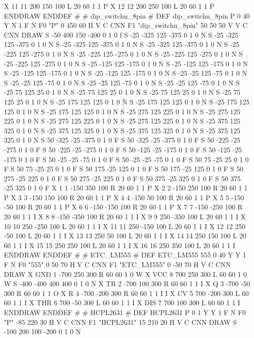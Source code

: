 X 11 11 200 150 100 L 20 60 1 1 P
X 12 12 200 250 100 L 20 60 1 1 P
ENDDRAW
ENDDEF
#
# dip_switchn_8pin
#
DEF dip_switchn_8pin P 0 40 Y N 1 F N
F0 "P" 0 450 60 H V C CNN
F1 "dip_switchn_8pin" 50 50 50 V V C CNN
DRAW
S -50 400 150 -400 0 1 0 f
S -25 -325 125 -375 0 1 0 N
S -25 -325 125 -375 0 1 0 N
S -25 -325 125 -375 0 1 0 N
S -25 -325 125 -375 0 1 0 N
S -25 -225 125 -275 0 1 0 N
S -25 -225 125 -275 0 1 0 N
S -25 -225 125 -275 0 1 0 N
S -25 -225 125 -275 0 1 0 N
S -25 -125 125 -175 0 1 0 N
S -25 -125 125 -175 0 1 0 N
S -25 -125 125 -175 0 1 0 N
S -25 -125 125 -175 0 1 0 N
S -25 -25 125 -75 0 1 0 N
S -25 -25 125 -75 0 1 0 N
S -25 -25 125 -75 0 1 0 N
S -25 -25 125 -75 0 1 0 N
S -25 75 125 25 0 1 0 N
S -25 75 125 25 0 1 0 N
S -25 75 125 25 0 1 0 N
S -25 75 125 25 0 1 0 N
S -25 175 125 125 0 1 0 N
S -25 175 125 125 0 1 0 N
S -25 175 125 125 0 1 0 N
S -25 175 125 125 0 1 0 N
S -25 275 125 225 0 1 0 N
S -25 275 125 225 0 1 0 N
S -25 275 125 225 0 1 0 N
S -25 275 125 225 0 1 0 N
S -25 375 125 325 0 1 0 N
S -25 375 125 325 0 1 0 N
S -25 375 125 325 0 1 0 N
S -25 375 125 325 0 1 0 N
S 50 -325 -25 -375 0 1 0 F
S 50 -325 -25 -375 0 1 0 F
S 50 -225 -25 -275 0 1 0 F
S 50 -225 -25 -275 0 1 0 F
S 50 -125 -25 -175 0 1 0 F
S 50 -125 -25 -175 0 1 0 F
S 50 -25 -25 -75 0 1 0 F
S 50 -25 -25 -75 0 1 0 F
S 50 75 -25 25 0 1 0 F
S 50 75 -25 25 0 1 0 F
S 50 175 -25 125 0 1 0 F
S 50 175 -25 125 0 1 0 F
S 50 275 -25 225 0 1 0 F
S 50 275 -25 225 0 1 0 F
S 50 375 -25 325 0 1 0 F
S 50 375 -25 325 0 1 0 F
X 1 1 -150 350 100 R 20 60 1 1 P
X 2 2 -150 250 100 R 20 60 1 1 P
X 3 3 -150 150 100 R 20 60 1 1 P
X 4 4 -150 50 100 R 20 60 1 1 P
X 5 5 -150 -50 100 R 20 60 1 1 P
X 6 6 -150 -150 100 R 20 60 1 1 P
X 7 7 -150 -250 100 R 20 60 1 1 I
X 8 8 -150 -350 100 R 20 60 1 1 I
X 9 9 250 -350 100 L 20 60 1 1 I
X 10 10 250 -250 100 L 20 60 1 1 I
X 11 11 250 -150 100 L 20 60 1 1 I
X 12 12 250 -50 100 L 20 60 1 1 I
X 13 13 250 50 100 L 20 60 1 1 I
X 14 14 250 150 100 L 20 60 1 1 I
X 15 15 250 250 100 L 20 60 1 1 I
X 16 16 250 350 100 L 20 60 1 1 I
ENDDRAW
ENDDEF
#
# ETC_LM555
#
DEF ETC_LM555 555 0 40 Y Y 1 F N
F0 "555" 0 50 70 H V C CNN
F1 "ETC_LM555" 0 -50 70 H V C CNN
DRAW
X GND 1 -700 250 300 R 60 60 1 0 W
X VCC 8 700 250 300 L 60 60 1 0 W
S -400 -400 400 400 0 1 0 N
X TR 2 -700 100 300 R 60 60 1 1 I
X Q 3 -700 -50 300 R 60 60 1 1 O
X R 4 -700 -200 300 R 60 60 1 1 I I
X CV 5 700 -200 300 L 60 60 1 1 I
X THR 6 700 -50 300 L 60 60 1 1 I
X DIS 7 700 100 300 L 60 60 1 1 I
ENDDRAW
ENDDEF
#
# HCPL2631
#
DEF HCPL2631 P 0 1 Y Y 1 F N
F0 "P" -85 220 30 H V C CNN
F1 "HCPL2631" 15 210 20 H V C CNN
DRAW
S -100 200 100 -200 0 1 0 N
